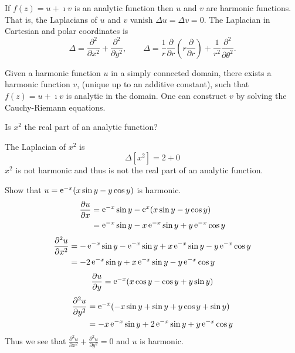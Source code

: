 \begin{Result}
  \label{result harmonic conjugate}
  If $f(z) = u + \imath v$ is an analytic function then $u$ and $v$
  are harmonic functions.  That is, the Laplacians of $u$ and $v$ vanish 
  $\Delta u = \Delta v = 0$.  The Laplacian in Cartesian and polar coordinates is
  \[
  \Delta = \frac{\partial^2}{\partial x^2} + \frac{\partial^2}{\partial y^2}, \qquad
  \Delta = \frac{1}{r} \frac{\partial}{\partial r} \left( r \frac{\partial}{\partial r} \right)
  + \frac{1}{r^2} \frac{\partial^2}{\partial \theta^2}.
  \]

  Given a harmonic function $u$ in a simply connected domain, there exists
  a harmonic function $v$, (unique up to an additive constant), such that
  $f(z) = u + \imath v$ is analytic in the domain.  One can construct $v$ by 
  solving the Cauchy-Riemann equations.
\end{Result}





\begin{Example}
  Is $x^2$ the real part of an analytic function?

  The Laplacian of $x^2$ is
  \[ 
  \Delta [ x^2 ] = 2 + 0 
  \]
  $x^2$ is not harmonic and thus is not the real part of an analytic function.
\end{Example}






\begin{Example}
  Show that $u = \mathop{\mathrm{e}}\nolimits^{-x} (x \sin y - y \cos y)$ is harmonic.
  \begin{align*}
    \frac{\partial u}{\partial x} &= \mathop{\mathrm{e}}\nolimits^{-x} \sin y - \mathop{\mathrm{e}}\nolimits^x (x \sin y - y \cos y) 
    \\
    &= \mathop{\mathrm{e}}\nolimits^{-x} \sin y - x \mathop{\mathrm{e}}\nolimits^{-x} \sin y + y \mathop{\mathrm{e}}\nolimits^{-x} \cos y
  \end{align*}
  \begin{align*}
    \frac{\partial^2 u}{\partial x^2} &=
    -\mathop{\mathrm{e}}\nolimits^{-x} \sin y - \mathop{\mathrm{e}}\nolimits^{-x} \sin y + x \mathop{\mathrm{e}}\nolimits^{-x} \sin y - y \mathop{\mathrm{e}}\nolimits^{-x} \cos y 
    \\
    &= -2 \mathop{\mathrm{e}}\nolimits^{-x} \sin y + x \mathop{\mathrm{e}}\nolimits^{-x} \sin y - y \mathop{\mathrm{e}}\nolimits^{-x} \cos y
  \end{align*}
  \[
  \frac{\partial u}{\partial y} = \mathop{\mathrm{e}}\nolimits^{-x} (x \cos y - \cos y + y \sin y)
  \]
  \begin{align*}
    \frac{\partial^2 u}{\partial y^2} 
    &= \mathop{\mathrm{e}}\nolimits^{-x} (-x \sin y + \sin y + y \cos y + \sin y) \\
    &= -x \mathop{\mathrm{e}}\nolimits^{-x} \sin y + 2 \mathop{\mathrm{e}}\nolimits^{-x} \sin y + y \mathop{\mathrm{e}}\nolimits^{-x} \cos y
  \end{align*}
  Thus we see that $\frac{\partial^2 u}{\partial x^2} + \frac{\partial^2 u}{\partial y^2} = 0$ and $u$ 
  is harmonic.
\end{Example}





